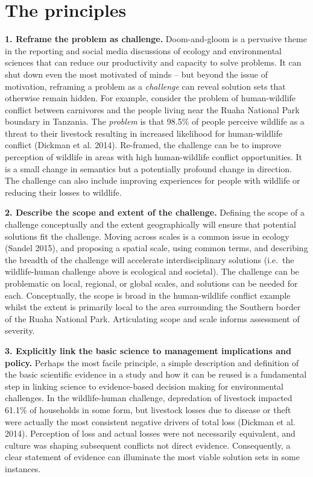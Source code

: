 \documentclass[fleqn,10pt]{wlpeerj} %
\begin{document}
\hypertarget{the-principles}{%
\section*{The principles}\label{the-principles}}

\textbf{1. Reframe the problem as challenge.} Doom-and-gloom is a
pervasive theme in the reporting and social media discussions of ecology
and environmental sciences that can reduce our productivity and capacity
to solve problems. It can shut down even the most motivated of minds --
but beyond the issue of motivation, reframing a problem as a
\emph{challenge} can reveal solution sets that otherwise remain hidden.
For example, consider the problem of human-wildlife conflict between
carnivores and the people living near the Ruaha National Park boundary
in Tanzania. The \emph{problem} is that 98.5\% of people perceive
wildlife as a threat to their livestock resulting in increased
likelihood for human-wildlife conflict (Dickman et al. 2014). Re-framed,
the challenge can be to improve perception of wildlife in areas with
high human-wildlife conflict opportunities. It is a small change in
semantics but a potentially profound change in direction. The challenge
can also include improving experiences for people with wildlife or
reducing their losses to wildlife.

\textbf{2. Describe the scope and extent of the challenge.} Defining the
scope of a challenge conceptually and the extent geographically will
ensure that potential solutions fit the challenge. Moving across scales
is a common issue in ecology (Sandel 2015), and proposing a spatial
scale, using common terms, and describing the breadth of the challenge
will accelerate interdisciplinary solutions (i.e.~the wildlife-human
challenge above is ecological and societal). The challenge can be
problematic on local, regional, or global scales, and solutions can be
needed for each. Conceptually, the scope is broad in the human-wildlife
conflict example whilst the extent is primarily local to the area
surrounding the Southern border of the Ruaha National Park. Articulating
scope and scale informs assessment of severity.

\textbf{3. Explicitly link the basic science to management implications
and policy.} Perhaps the most facile principle, a simple description and
definition of the basic scientific evidence in a study and how it can be
reused is a fundamental step in linking science to evidence-based
decision making for environmental challenges. In the wildlife-human
challenge, depredation of livestock impacted 61.1\% of households in
some form, but livestock losses due to disease or theft were actually
the most consistent negative drivers of total loss (Dickman et al.
2014). Perception of loss and actual losses were not necessarily
equivalent, and culture was shaping subsequent conflicts not direct
evidence. Consequently, a clear statement of evidence can illuminate the
most viable solution sets in some instances.
\end{document}
